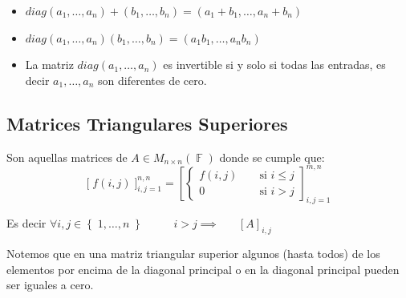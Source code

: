 \documentclass[12pt, fleqn]{report}                             %
\DeclareMathOperator \Space     {\quad}                         %
\DeclareMathOperator \MegaSpace {\quad \quad}                   %
\DeclareMathOperator \MiniSpace {\;}                            %
\theoremstyle{break}                                            %
\DeclareMathOperator \GenericField {\mathbb{F}}                 %
\newcommand{\Set}[1]            {\left\{ \; #1 \; \right\}}     %
\newcommand{\Brackets}[1]       {\left[ #1 \right]}             %
\newcommand{\BigBrackets}[1]    {\Big[ \; #1 \; \Big]}          %
\begin{document}
                \begin{itemize}
                    
                    \item
                        $diag(a_1, \dots, a_n) + (b_1, \dots, b_n) = (a_1+b_1, \dots, a_n+b_n)$

                    \item
                        $diag(a_1, \dots, a_n)(b_1, \dots, b_n) = (a_1b_1, \dots, a_nb_n)$

                    \item 
                        La matriz $diag(a_1, \dots, a_n)$ es invertible si y solo si todas las entradas, 
                        es decir $a_1, \dots, a_n$ son diferentes de cero. 

                \end{itemize}



            \clearpage
            \subsection{Matrices Triangulares Superiores}

                Son aquellas matrices de $A \in M_{n \times n}(\GenericField)$ donde se cumple que: 
                \begin{equation*}
                    \BigBrackets{f(i,j)}_{i, j = 1}^{n, n}
                    =
                    \Brackets{
                        \begin{cases}
                            f(i,j)  \MiniSpace& \text{ si } i \leq j \\
                            0       \MiniSpace& \text{ si } i > j
                        \end{cases}
                    }_{i, j = 1}^{m, n}  
                \end{equation*}

                Es decir $\forall i, j \in \Set{1, \dots, n} \MegaSpace i > j \implies \Space [A]_{i, j}$

                \vspace{1em}

                Notemos que en una matriz triangular superior algunos (hasta todos) de los elementos
                por encima de la diagonal principal o en la diagonal principal pueden ser iguales a cero.
\end{document}
